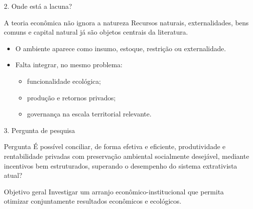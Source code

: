 \documentclass[aspectratio=169,11pt]{beamer}
\begin{document}
\begin{frame}{2. Onde está a lacuna?}
  \begin{block}{A teoria econômica não ignora a natureza}
    Recursos naturais, externalidades, bens comuns e capital natural já são
    objetos centrais da literatura.
  \end{block}

  \vspace{0.4cm}
  \begin{itemize}
    \item O ambiente aparece como insumo, estoque, restrição ou externalidade.
    \item Falta integrar, no mesmo problema:
      \begin{itemize}
        \item funcionalidade ecológica;
        \item produção e retornos privados;
        \item governança na escala territorial relevante.
      \end{itemize}
  \end{itemize}

\end{frame}

\begin{frame}{3. Pergunta de pesquisa}
  \begin{block}{Pergunta}
    É possível conciliar, de forma efetiva e eficiente, produtividade e
    rentabilidade privadas com preservação ambiental socialmente desejável,
    mediante incentivos bem estruturados, superando o desempenho do sistema
    extrativista atual?
  \end{block}

  \vspace{0.35cm}
  \begin{block}{Objetivo geral}
    Investigar um arranjo econômico-institucional que permita otimizar
    conjuntamente resultados econômicos e ecológicos.
  \end{block}

\end{frame}
\end{document}
